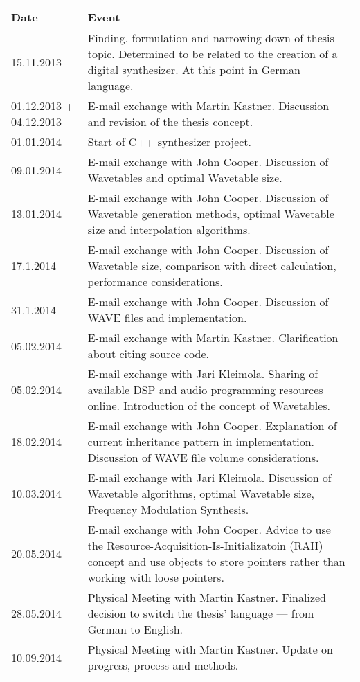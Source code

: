 \documentclass[12pt]{report}
\begin{document}
{ \small
\begin{tabular}{| p{2cm} | p{13cm} |}
  \hline
  \rowcolor[gray]{0.8}
  Date & Event \\
  \hline
  15.11.2013 &  Finding, formulation and narrowing down of thesis topic. Determined to be related to the creation of a digital synthesizer. At this point in German language.\\
  \hline
  01.12.2013 + 04.12.2013 & E-mail exchange with Martin Kastner. Discussion and revision of the thesis concept. \\
  \hline
  01.01.2014 & Start of C++ synthesizer project. \\
  \hline
  09.01.2014 & E-mail exchange with John Cooper. Discussion of Wavetables and optimal Wavetable size. \\
  \hline
  13.01.2014 & E-mail exchange with John Cooper. Discussion of Wavetable generation methods, optimal Wavetable size and interpolation algorithms. \\
  \hline
  17.1.2014 & E-mail exchange with John Cooper. Discussion of Wavetable size, comparison with direct calculation, performance considerations. \\
  \hline
  31.1.2014 & E-mail exchange with John Cooper. Discussion of WAVE files and implementation. \\
  \hline
  05.02.2014 & E-mail exchange with Martin Kastner. Clarification about citing source code. \\
  \hline
  05.02.2014 & E-mail exchange with Jari Kleimola. Sharing of available DSP and audio programming resources online. Introduction of the concept of Wavetables. \\
  \hline
  18.02.2014 & E-mail exchange with John Cooper. Explanation of current inheritance pattern in implementation. Discussion of WAVE file volume considerations. \\
  \hline
  10.03.2014 & E-mail exchange with Jari Kleimola. Discussion of Wavetable algorithms, optimal Wavetable size, Frequency Modulation Synthesis. \\
  \hline
  20.05.2014 & E-mail exchange with John Cooper. Advice to use the Resource-Acquisition-Is-Initializatoin (RAII) concept and use objects to store pointers rather than working with loose pointers. \\
  \hline
  28.05.2014 & Physical Meeting with Martin Kastner. Finalized decision to switch the thesis' language --- from German to English. \\
  \hline
  10.09.2014 & Physical Meeting with Martin Kastner. Update on progress, process and methods. \\

\end{tabular}}
\end{document}
